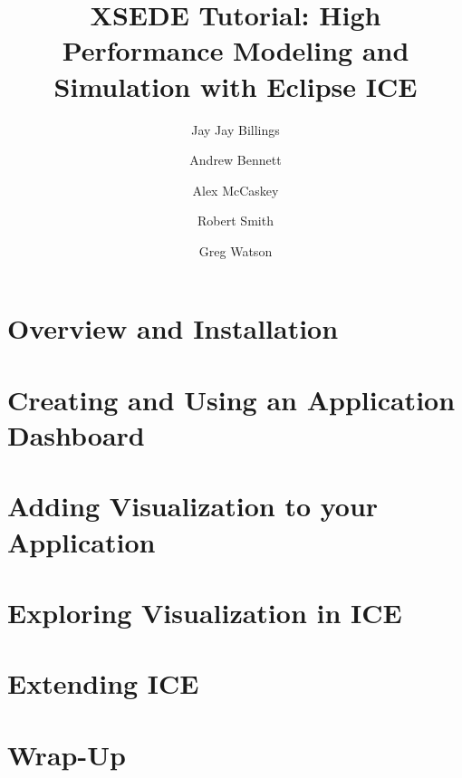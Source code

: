 \documentclass{report}
\begin{document}
\title{XSEDE Tutorial: High Performance Modeling and Simulation with Eclipse ICE}
\author{Jay Jay Billings}
\author{Andrew Bennett}
\author{Alex McCaskey}
\author{Robert Smith}
\author{Greg Watson}

\maketitle{} 

\tableofcontents

\chapter{Overview and Installation}


\graphicspath{{../../installation/src/}}


\chapter{Creating and Using an Application Dashboard}
\graphicspath{{../../newItemGeneration/src/}}



\chapter{Adding Visualization to your Application}
\graphicspath{{../../resourceComponents/src/}}


\chapter{Exploring Visualization in ICE}
\graphicspath{{../../geometryEditor/src/}}


\graphicspath{{../../meshEditor/src/}}


\graphicspath{{../../visualization/src/}}

 
\chapter{Extending ICE}
\graphicspath{{../../scripting/src/}}
\lstset{inputpath=../../scripting/src/}


\graphicspath{{../../dynamicUI/src/}}


\chapter{Wrap-Up}
\end{document}
